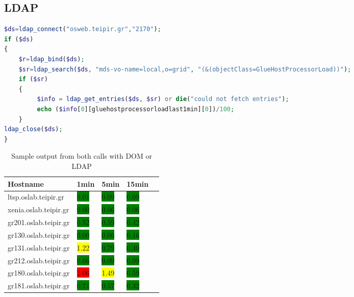 \subsection{LDAP}

\begin{lstlisting}[language=PHP,caption=PHP LDAP call to BDII]
$ds=ldap_connect("osweb.teipir.gr","2170");
if ($ds)
{
    $r=ldap_bind($ds);
    $sr=ldap_search($ds, "mds-vo-name=local,o=grid", "(&(objectClass=GlueHostProcessorLoad))");
    if ($sr)
    {
         $info = ldap_get_entries($ds, $sr) or die("could not fetch entries");
         echo ($info[0][gluehostprocessorloadlast1min][0])/100;
    }
ldap_close($ds);
}
\end{lstlisting}



\begin{table}[ht]
\small\addtolength{\tabcolsep}{-3pt}
\begin{tabular}{ | l | l | l | l | l |}
\hline
 Hostname & 1min & 5min & 15min \\ \hline
 ltsp.oslab.teipir.gr & \colorbox{green}{0.01} & \colorbox{green}{0.09} & \colorbox{green}{0.09} \\ \hline
 xenia.oslab.teipir.gr & \colorbox{green}{0.00} & \colorbox{green}{0.06} & \colorbox{green}{0.06} \\ \hline
 gr201.oslab.teipir.gr & \colorbox{green}{0.52} & \colorbox{green}{0.59} & \colorbox{green}{0.42} \\ \hline
 gr130.oslab.teipir.gr & \colorbox{green}{0.00} & \colorbox{green}{0.06} & \colorbox{green}{0.16} \\ \hline
 gr131.oslab.teipir.gr & \colorbox{yellow}{1.22} & \colorbox{green}{0.79} & \colorbox{green}{0.40} \\ \hline
 gr212.oslab.teipir.gr & \colorbox{green}{0.06} & \colorbox{green}{0.09} & \colorbox{green}{0.09} \\ \hline
 gr180.oslab.teipir.gr & \colorbox{red}{2.06} & \colorbox{yellow}{1.49} & \colorbox{green}{0.59} \\ \hline
 gr181.oslab.teipir.gr & \colorbox{green}{0.71} & \colorbox{green}{0.57} & \colorbox{green}{0.32} \\ \hline
\end{tabular}
\caption{Sample output from both calls with DOM or LDAP}
\label{tab:html_output}
\end{table}


